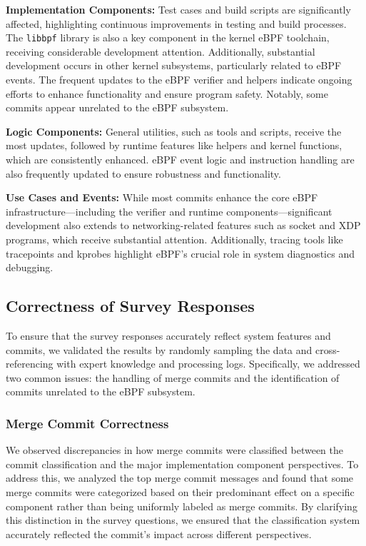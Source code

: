 \textbf{Implementation Components:} Test cases and build scripts are significantly affected, highlighting continuous improvements in testing and build processes. The \texttt{libbpf} library is also a key component in the kernel eBPF toolchain, receiving considerable development attention. Additionally, substantial development occurs in other kernel subsystems, particularly related to eBPF events. The frequent updates to the eBPF verifier and helpers indicate ongoing efforts to enhance functionality and ensure program safety. Notably, some commits appear unrelated to the eBPF subsystem.

\textbf{Logic Components:} General utilities, such as tools and scripts, receive the most updates, followed by runtime features like helpers and kernel functions, which are consistently enhanced. eBPF event logic and instruction handling are also frequently updated to ensure robustness and functionality.

\textbf{Use Cases and Events:} While most commits enhance the core eBPF infrastructure—including the verifier and runtime components—significant development also extends to networking-related features such as socket and XDP programs, which receive substantial attention. Additionally, tracing tools like tracepoints and kprobes highlight eBPF's crucial role in system diagnostics and debugging.

\subsection{Correctness of Survey Responses}

To ensure that the survey responses accurately reflect system features and commits, we validated the results by randomly sampling the data and cross-referencing with expert knowledge and processing logs. Specifically, we addressed two common issues: the handling of merge commits and the identification of commits unrelated to the eBPF subsystem.

\subsubsection{Merge Commit Correctness}

We observed discrepancies in how merge commits were classified between the commit classification and the major implementation component perspectives. To address this, we analyzed the top merge commit messages and found that some merge commits were categorized based on their predominant effect on a specific component rather than being uniformly labeled as merge commits. By clarifying this distinction in the survey questions, we ensured that the classification system accurately reflected the commit's impact across different perspectives.

